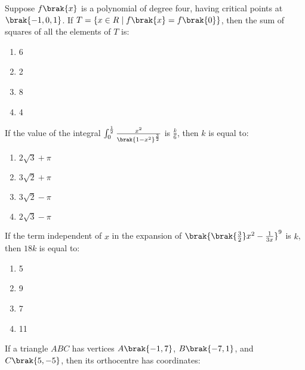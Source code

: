 \item Suppose $f\brak{x}$ is a polynomial of degree four, having critical points at $\brak{-1, 0, 1}$. If $T = \{ x \in R \mid f\brak{x} = f\brak{0} \}$, then the sum of squares of all the elements of $T$ is: \hfill {}

        \begin{multicols}{4}

\begin{enumerate}
    \item 6
    \item 2
    \item 8
    \item 4
\end{enumerate}
\end{multicols}

\item If the value of the integral $ \int_{0}^{\frac{1}{2}} \frac{x^2}{\brak{1 - x^2}^{\frac{3}{2}}}$ is $\frac{k}{6}$, then $k$ is equal to: \hfill {}

        
          \begin{multicols}{4}
\begin{enumerate}
    \item $2\sqrt{3} + \pi$
    \item $3\sqrt{2} + \pi$
    \item $3\sqrt{2} - \pi$
    \item $2\sqrt{3} - \pi$
\end{enumerate}
\end{multicols}

 \item If the term independent of $x$ in the expansion of $\brak{ \brak{ \frac{3}{2} } x^2 - \frac{1}{3x} }^9$ is $k$, then $18k$ is equal to:  \hfill {}

        \begin{multicols}{4}

\begin{enumerate}
    \item 5
    \item 9
    \item 7
    \item 11
\end{enumerate}
\end{multicols}

\item If a triangle $ABC$ has vertices $A\brak{-1, 7}$, $B\brak{-7, 1}$, and $C\brak{5, -5}$, then its orthocentre has coordinates:  \hfill {}

